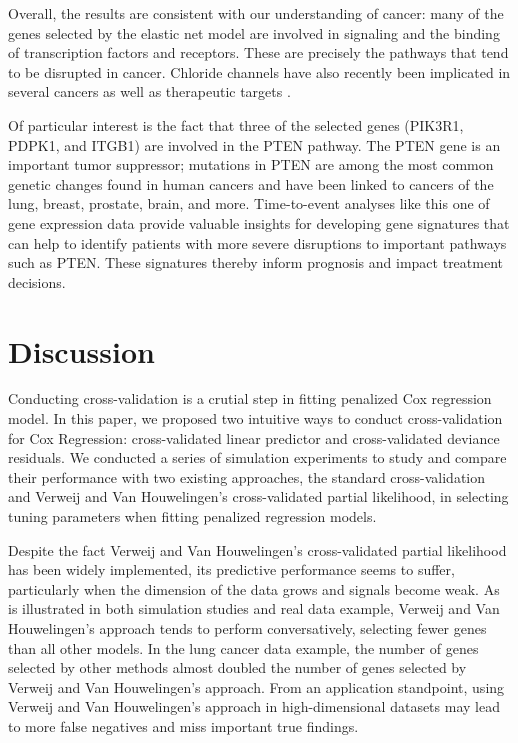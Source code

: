 Overall, the results are consistent with our understanding of cancer: many of the genes selected by the elastic net model are involved in signaling and the binding of transcription factors and receptors.  These are precisely the pathways that tend to be disrupted in cancer.  Chloride channels have also recently been implicated in several cancers as well as therapeutic targets \citep{Peretti2015}.

Of particular interest is the fact that three of the selected genes (PIK3R1, PDPK1, and ITGB1) are involved in the PTEN pathway.  The PTEN gene is an important tumor suppressor; mutations in PTEN are among the most common genetic changes found in human cancers and have been linked to cancers of the lung, breast, prostate, brain, and more.  Time-to-event analyses like this one of gene expression data provide valuable insights for developing gene signatures that can help to identify patients with more severe disruptions to important pathways such as PTEN.  These signatures thereby inform prognosis and impact treatment decisions.

\section{Discussion}

Conducting cross-validation is a crutial step in fitting penalized Cox regression model. In this paper, we proposed two intuitive ways to conduct cross-validation for Cox Regression: cross-validated linear predictor and cross-validated deviance residuals. We conducted a series of simulation experiments to study and compare their performance with two existing approaches, the standard cross-validation and Verweij and Van Houwelingen's cross-validated partial likelihood, in selecting tuning parameters when fitting penalized regression models. 

Despite the fact Verweij and Van Houwelingen's cross-validated partial likelihood has been widely implemented, its predictive performance seems to suffer, particularly when the dimension of the data grows and signals become weak. As is illustrated in both simulation studies and real data example, Verweij and Van Houwelingen's approach tends to perform conversatively, selecting fewer genes than all other models. In the lung cancer data example, the number of genes selected by other methods almost doubled the number of genes selected by Verweij and Van Houwelingen's approach. From an application standpoint, using Verweij and Van Houwelingen's approach in high-dimensional datasets may lead to more false negatives and miss important true findings.

